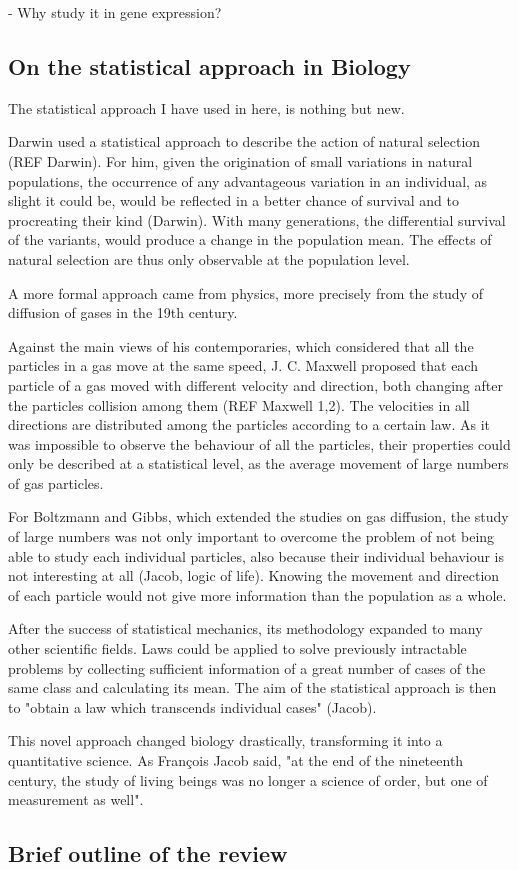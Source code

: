 - Why study it in gene expression?

\subsection{On the statistical approach in Biology}
The statistical approach I have used in here, is nothing but new.

Darwin used a statistical approach to describe the action of natural selection (REF Darwin). For him, given the origination of small variations in natural populations, the occurrence of any advantageous variation in an individual, as slight it could be, would be reflected in a better chance of survival and to procreating their kind (Darwin). With many generations, the differential survival of the variants, would produce a change in the population mean. 
The effects of natural selection are thus only observable at the population level.

A more formal approach came from physics, more precisely from the study of diffusion of gases in the 19th century.

Against the main views of his contemporaries, which considered that all the particles in a gas move at the same speed, J. C. Maxwell proposed that each particle of a gas moved with different velocity and direction, both changing after the particles collision among them (REF Maxwell 1,2).
The velocities in all directions are distributed among the particles according to a certain law. As it was impossible to observe the behaviour of all the particles, their properties could only be described at a statistical level, as the average movement of large numbers of gas particles.

For Boltzmann and Gibbs, which extended the studies on gas diffusion, the study of large numbers was not only important to overcome the problem of not being able to study each individual particles, also because their individual behaviour is not interesting at all (Jacob, logic of life). Knowing the movement and direction of each particle would not give more information than the population as a whole.

After the success of statistical mechanics, its methodology expanded to many other scientific fields.
Laws could be applied to solve previously intractable problems by collecting sufficient information of a great number of cases of the same class and calculating its mean. The aim of the statistical approach is then to "obtain a law which transcends individual cases" (Jacob).

This novel approach changed biology drastically, transforming it into a quantitative science. As Fran\c{c}ois Jacob said, "at the end of the nineteenth century, the study of living beings was no longer a science of order, but one of measurement as well".



\subsection{Brief outline of the review}

